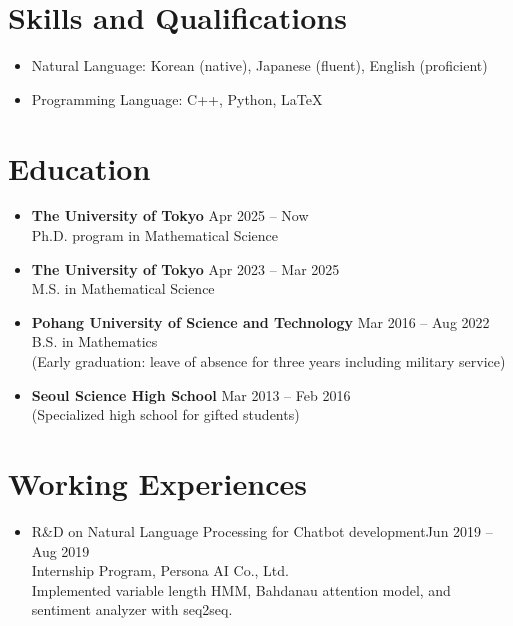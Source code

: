 \documentclass[11pt,a4paper]{article}
\begin{document}
\section*{Skills and Qualifications}
\begin{itemize}
\item Natural Language: Korean (native), Japanese (fluent), English (proficient)
\item Programming Language: C++, Python, LaTeX
\end{itemize}
	



\section*{Education}
\begin{itemize}
\item
	\textbf{The University of Tokyo}
	\hfill{\small Apr 2025 -- Now}\\
	Ph.D. program in Mathematical Science
\item
	\textbf{The University of Tokyo}
	\hfill{\small Apr 2023 -- Mar 2025}\\
	M.S. in Mathematical Science
\item
	\textbf{Pohang University of Science and Technology}
	\hfill{\small Mar 2016 -- Aug 2022}\\
	B.S. in Mathematics\\
	(Early graduation: leave of absence for three years including military service)
\item
	\textbf{Seoul Science High School}
	\hfill{\small Mar 2013 -- Feb 2016}\\
	(Specialized high school for gifted students)
\end{itemize}





\section*{Working Experiences}


\begin{itemize}
\item
	R\&D on Natural Language Processing for Chatbot development\hfill{\small Jun 2019 -- Aug 2019}\\
	Internship Program, Persona AI Co., Ltd.\\[4pt]
	\faArrowRight\quad
	Implemented variable length HMM, Bahdanau attention model, and sentiment analyzer with seq2seq.
\end{itemize}
\end{document}
